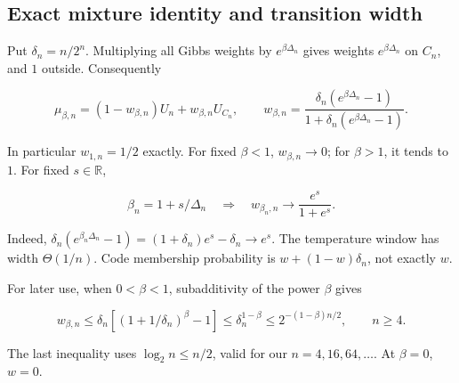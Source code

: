 \subsection{Exact mixture identity and transition width}\label{qm:exact-mixture-identity-and-transition-width}

Put \(\delta_n=n/2^n\). Multiplying all Gibbs weights by \(e^{\beta\Delta_n}\) gives weights \(e^{\beta\Delta_n}\) on \(C_n\), and \(1\) outside. Consequently

\[
\mu_{\beta,n}=(1-w_{\beta,n})U_n+w_{\beta,n}U_{C_n},\qquad
w_{\beta,n}=\frac{\delta_n(e^{\beta\Delta_n}-1)}{1+\delta_n(e^{\beta\Delta_n}-1)}.
\]

In particular \(w_{1,n}=1/2\) exactly. For fixed \(\beta<1\), \(w_{\beta,n}\to0\); for \(\beta>1\), it tends to \(1\). For fixed \(s\in\mathbb R\),

\[
\beta_n=1+s/\Delta_n\quad\Longrightarrow\quad
w_{\beta_n,n}\longrightarrow\frac{e^s}{1+e^s}.
\]

Indeed, \(\delta_n(e^{\beta_n\Delta_n}-1)=(1+\delta_n)e^s-\delta_n\to e^s\). The temperature window has width \(\Theta(1/n)\). Code membership probability is \(w+(1-w)\delta_n\), not exactly \(w\).

For later use, when \(0<\beta<1\), subadditivity of the power \(\beta\) gives

\[
w_{\beta,n}\le\delta_n[(1+1/\delta_n)^\beta-1]
\le\delta_n^{1-\beta}
\le2^{-(1-\beta)n/2},\qquad n\ge4.
\]

The last inequality uses \(\log_2 n\le n/2\), valid for our \(n=4,16,64,\ldots\). At \(\beta=0\), \(w=0\).
